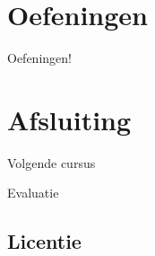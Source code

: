 \documentclass[
    dutch,
    everyoneauthor=true,
    defaultSlideCollection=vincent,
    handout
]{../../cursuspresentatie}
\let\placetarget\relax
\let\placetarget\relax
\begin{document}

\section{Oefeningen}

\def\placetarget{\hypertarget{oefeningen2}{}}

\begin{frame}
    \begin{center}
        {\LARGE Oefeningen!}
        \vspace{30pt}

        

    \end{center}
\end{frame}





\section{Afsluiting}

\begin{frame}
    Volgende cursus
\end{frame}

\begin{frame}
    Evaluatie
\end{frame}

\subsection{Licentie}
    
\end{document}
